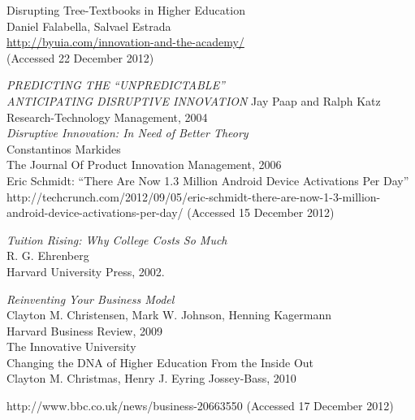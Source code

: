 \documentclass[a4paper,10pt]{book}
\begin{document}
\begin{thebibliography}{9}
  Disrupting Tree-Textbooks in Higher Education\\
  Daniel Falabella, Salvael Estrada\\
  \url{http://byuia.com/innovation-and-the-academy/}\\
   (Accessed 22 December 2012)

  \emph{PREDICTING THE “UNPREDICTABLE”\\
  ANTICIPATING DISRUPTIVE INNOVATION}
  Jay Paap and Ralph Katz\\
  Research-Technology Management, 2004\\ 

  \emph{Disruptive Innovation: In Need of Better Theory}\\
  Constantinos Markides\\
  The Journal Of Product Innovation Management, 2006\\


  Eric Schmidt: “There Are Now 1.3 Million Android Device Activations Per Day”
   http://techcrunch.com/2012/09/05/eric-schmidt-there-are-now-1-3-million-android-device-activations-per-day/
   (Accessed 15 December 2012)

 \emph{Tuition Rising: Why College Costs So Much} \\ 
 R. G. Ehrenberg\\
 Harvard University Press, 2002.
 
  \emph{Reinventing Your Business Model} \\
  Clayton M. Christensen, Mark W. Johnson, Henning Kagermann\\
  Harvard Business Review, 2009\\
 
 The Innovative University \\
 Changing the DNA of Higher Education From the Inside Out \\
 Clayton M. Christmas, Henry J. Eyring
 Jossey-Bass, 2010
 
 http://www.bbc.co.uk/news/business-20663550
 (Accessed 17 December 2012)


\end{thebibliography}
\end{document}
